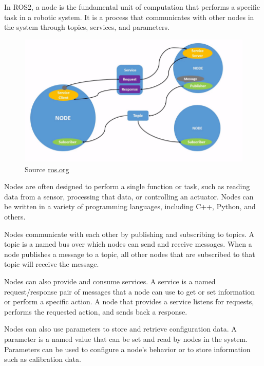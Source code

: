 \documentclass[
  letterpaper,
  DIV=11,
  numbers=noendperiod]{scrreprt}
\begin{document}
In ROS2, a node is the fundamental unit of computation that performs a
specific task in a robotic system. It is a process that communicates
with other nodes in the system through topics, services, and parameters.

\begin{figure}

{\centering \includegraphics{./images/nodes.gif}

}

\caption{Source
\href{https://docs.ros.org/en/foxy/Tutorials/Beginner-CLI-Tools/Understanding-ROS2-Nodes/Understanding-ROS2-Nodes.html}{ros.org}}

\end{figure}

Nodes are often designed to perform a single function or task, such as
reading data from a sensor, processing that data, or controlling an
actuator. Nodes can be written in a variety of programming languages,
including C++, Python, and others.

Nodes communicate with each other by publishing and subscribing to
topics. A topic is a named bus over which nodes can send and receive
messages. When a node publishes a message to a topic, all other nodes
that are subscribed to that topic will receive the message.

Nodes can also provide and consume services. A service is a named
request/response pair of messages that a node can use to get or set
information or perform a specific action. A node that provides a service
listens for requests, performs the requested action, and sends back a
response.

Nodes can also use parameters to store and retrieve configuration data.
A parameter is a named value that can be set and read by nodes in the
system. Parameters can be used to configure a node's behavior or to
store information such as calibration data.
\end{document}
